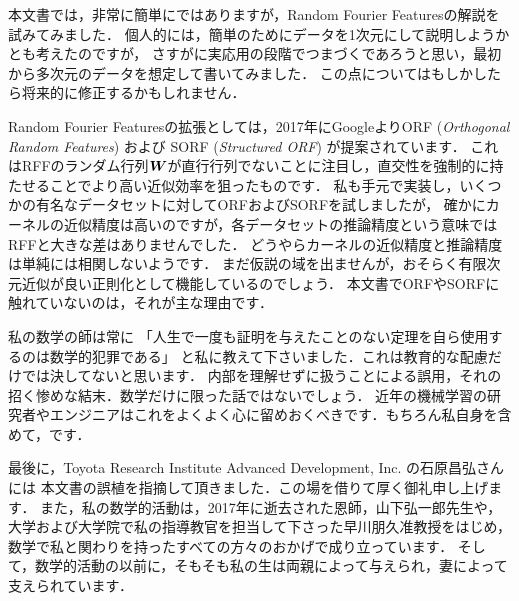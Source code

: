 %

本文書では，非常に簡単にではありますが，Random Fourier Featuresの解説を試みてみました．
個人的には，簡単のためにデータを1次元にして説明しようかとも考えたのですが，
さすがに実応用の段階でつまづくであろうと思い，最初から多次元のデータを想定して書いてみました．
この点についてはもしかしたら将来的に修正するかもしれません．

Random Fourier Featuresの拡張としては，2017年にGoogleよりORF (\textit{Orthogonal Random Features})
および SORF (\textit{Structured ORF}) が提案されています．
これはRFFのランダム行列$\boldsymbol{W}$が直行行列でないことに注目し，直交性を強制的に持たせることでより高い近似効率を狙ったものです．
私も手元で実装し，いくつかの有名なデータセットに対してORFおよびSORFを試しましたが，
確かにカーネルの近似精度は高いのですが，各データセットの推論精度という意味ではRFFと大きな差はありませんでした．
どうやらカーネルの近似精度と推論精度は単純には相関しないようです．
まだ仮説の域を出ませんが，おそらく有限次元近似が良い正則化として機能しているのでしょう．
本文書でORFやSORFに触れていないのは，それが主な理由です．

私の数学の師は常に
「人生で一度も証明を与えたことのない定理を自ら使用するのは数学的犯罪である」
と私に教えて下さいました．これは教育的な配慮だけでは決してないと思います．
内部を理解せずに扱うことによる誤用，それの招く惨めな結末．数学だけに限った話ではないでしょう．
近年の機械学習の研究者やエンジニアはこれをよくよく心に留めおくべきです．もちろん私自身を含めて，です．

最後に，Toyota Research Institute Advanced Development, Inc. の石原昌弘さんには
本文書の誤植を指摘して頂きました．この場を借りて厚く御礼申し上げます．
また，私の数学的活動は，2017年に逝去された恩師，山下弘一郎先生や，
大学および大学院で私の指導教官を担当して下さった早川朋久准教授をはじめ，
数学で私と関わりを持ったすべての方々のおかげで成り立っています．
そして，数学的活動の以前に，そもそも私の生は両親によって与えられ，妻によって支えられています．

